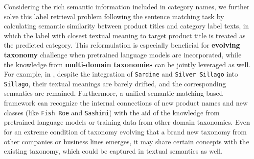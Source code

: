 Considering the rich semantic information included in category names, we further solve this label retrieval problem following the sentence matching task by calculating semantic similarity between product titles and category label texts, in which the label with closest textual meaning to target product title is treated as the predicted category. 
This reformulation is especially beneficial for \textbf{evolving taxonomy} challenge when pretrained language models are incorporated, while the knowledge from \textbf{multi-domain taxonomies} can be jointly leveraged as well.
For example, in , despite the integration of \verb|Sardine| and \verb|Silver Sillago| into \verb|Sillago|, their textual meanings are barely drifted, and the corresponding semantics are remained. 
Furthermore, a unified semantic-matching-based framework can recognize the internal connections of new product names and new classes (like \verb|Fish Roe| and \verb|Sashimi|) with the aid of the knowledge from pretrained language models or training data from other domain taxonomies. Even for an extreme condition of taxonomy evolving that a brand new taxonomy from other companies or business lines emerges, it may share certain concepts with the existing taxonomy, which could be captured in textual semantics as well. 

